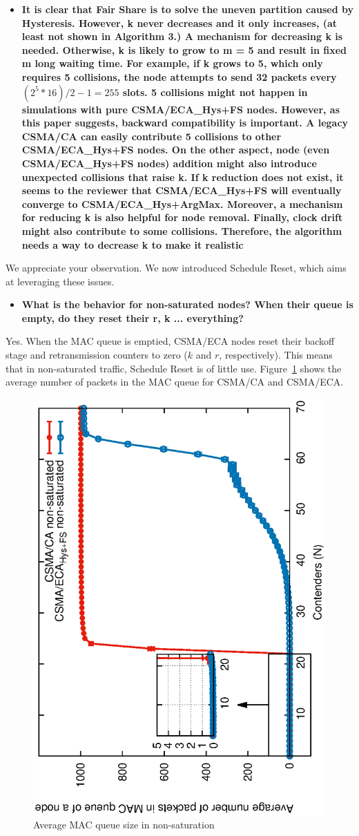 \documentclass[]{article}
\begin{document}
		\begin{itemize}
			\item {\bfseries It is clear that Fair Share is to solve the uneven partition caused by Hysteresis. However, k never decreases and it only increases, (at least not shown in Algorithm 3.) A mechanism for decreasing k is needed. Otherwise, k is likely to grow to m = 5 and result in fixed m long waiting time. For example, if k grows to 5, which only requires 5 collisions, the node attempts to send 32 packets every $(2 ^ 5 * 16)/2 - 1 = 255$ slots. 5 collisions might not happen in simulations with pure CSMA/ECA\_{Hys+FS} nodes. However, as this paper suggests, backward compatibility is important. A legacy CSMA/CA can easily contribute 5 collisions to other CSMA/ECA\_{Hys+FS} nodes. On the other aspect, node (even CSMA/ECA\_{Hys+FS} nodes) addition might also introduce unexpected collisions that raise k. If k reduction does not exist, it seems to the reviewer that CSMA/ECA\_{Hys+FS} will eventually converge to CSMA/ECA\_{Hys+ArgMax}.  Moreover, a mechanism for reducing k is also helpful for node removal. Finally, clock drift might also contribute to some collisions. Therefore, the algorithm needs a way to decrease k to make it realistic}
		\end{itemize}
		
		We appreciate your observation. We now introduced Schedule Reset, which aims at leveraging these issues. 
		
		\begin{itemize}
			\item {\bfseries What is the behavior for non-saturated nodes? When their queue is empty, do they reset their r, k ... everything?}
		\end{itemize}
		
		Yes. When the MAC queue is emptied, CSMA/ECA nodes reset their backoff stage and retransmission counters to zero ($k$ and $r$, respectively). This means that in non-saturated traffic, Schedule Reset is of little use. Figure~\ref{fig:queueSize} shows the average number of packets in the MAC queue for CSMA/CA and CSMA/ECA.
		
		\begin{figure}[tb]
		\centering
			\includegraphics[width=0.45\linewidth,angle=-90]{figures/unsaturated/queueSize/queueSize-multiplot-TON.eps}
			\caption{Average MAC queue size in non-saturation}
			\label{fig:queueSize}
		\end{figure}
		
\end{document}
